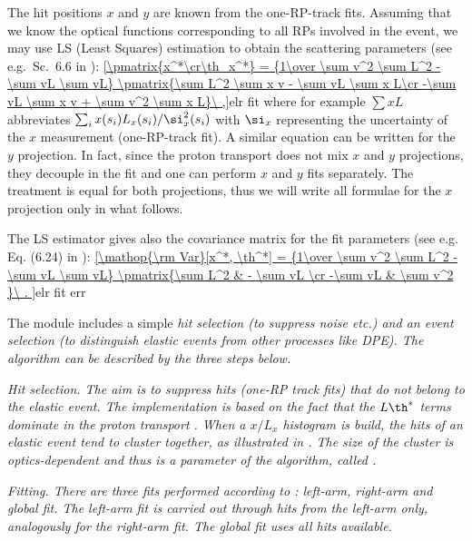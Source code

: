 The hit positions $x$ and $y$ are known from the one-RP-track fits. Assuming that we know the optical functions corresponding to all RPs involved in the event, we may use LS (Least Squares) estimation to obtain the scattering parameters (see e.g.~Sc.~6.6 in ):
\eqref{\pmatrix{x^*\cr\th_x^*} = {1\over \sum v^2 \sum L^2 - \sum vL \sum vL} \pmatrix{\sum L^2 \sum x v - \sum vL \sum x L\cr -\sum vL \sum x v + \sum v^2 \sum x L}\ ,}{elr fit}
where for example $\sum x L$ abbreviates $\sum_{i} x(s_i) L_x(s_i) / \si_x^2(s_i)$ with $\si_x$ representing the uncertainty of the $x$ measurement (one-RP-track fit). A similar equation can be written for the $y$ projection. In fact, since the proton transport  does not mix $x$ and $y$ projections, they decouple in the fit and one can perform $x$ and $y$ fits separately. The treatment is equal for both projections, thus we will write all formulae for the $x$ projection only in what follows.

The LS estimator gives also the covariance matrix for the fit parameters (see e.g. Eq. (6.24) in ):
\eqref{\mathop{\rm Var}[x^*, \th^*] = {1\over \sum v^2 \sum L^2 - \sum vL \sum vL} \pmatrix{\sum L^2 & - \sum vL \cr -\sum vL & \sum v^2 }\ .
}{elr fit err}

The module includes a simple \em{hit selection} (to suppress noise etc.) and an \em{event selection} (to distinguish elastic events from other processes like DPE). The algorithm can be described by the three steps below.

\bitm
\itm \em{Hit selection}. The aim is to suppress hits (one-RP track fits) that do not belong to the elastic event. The implementation is based on the fact that the $L\th^*$ terms dominate in the proton transport 
. When a $x/L_x$ histogram is build, the hits of an elastic event tend to cluster together, as illustrated in . The size of the cluster is optics-dependent and thus is a parameter of the algorithm, called .


\itm \em{Fitting}. There are three fits performed according to : left-arm, right-arm and global fit. The left-arm fit is carried out through hits from the left-arm only, analogously for the right-arm fit. The global fit uses all hits available.


